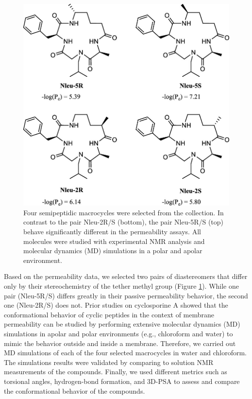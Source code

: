 %
\begin{figure}
    \centering
    \includegraphics[width=\textwidth]{7_chapter_5/fig/intro/permCliffMols.jpeg}
    \caption{Four semipeptidic macrocycles were selected from the collection. In contrast to the pair Nleu-2R/S (bottom), the pair Nleu-5R/S (top) behave significantly  different in the permeability assays. All molecules were  studied with experimental NMR analysis and molecular dynamics (MD) simulations in a polar and apolar environment.}
    \label{fig:permCMols}
\end{figure}
Based on the permeability data, we selected two pairs of diastereomers that differ only by their stereochemistry of the tether methyl group (Figure \ref{fig:permCMols}). While one pair (Nleu-5R/S) differs greatly in their passive permeability behavior, the second one (Nleu-2R/S) does not. 
Prior studies on cyclosporine A showed that the conformational behavior of cyclic peptides in the context of membrane permeability can be studied by performing extensive molecular dynamics (MD) simulations in apolar and polar environments (e.g., chloroform and water) to mimic the behavior outside and inside a membrane. \cite{Witek2016,Witek2017, Witek2019, Wang2021}
Therefore, we carried out MD simulations of each of the four selected macrocycles in water and chloroform. The simulations results were validated by comparing to solution NMR measurements of the compounds. \cite{Balazs2019,Stadelmann2020}
Finally, we used different metrics such as torsional angles, hydrogen-bond formation, and 3D-PSA\cite{Sebastiano2018} to assess and compare the conformational behavior of the compounds. 